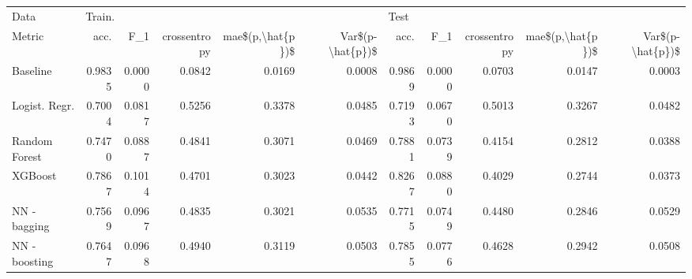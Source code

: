 \begin{tabular}{lrrrrrrrrrr}
\toprule
Data & \multicolumn{5}{l}{Train.} & \multicolumn{5}{l}{Test} \\
Metric &    acc. &     F\_1 & crossentropy & mae\$(p,\textbackslash hat\{p\})\$ & Var\$(p-\textbackslash hat\{p\})\$ &    acc. &     F\_1 & crossentropy & mae\$(p,\textbackslash hat\{p\})\$ & Var\$(p-\textbackslash hat\{p\})\$ \\
\midrule
Baseline      &  0.9835 &  0.0000 &       0.0842 &           0.0169 &           0.0008 &  0.9869 &  0.0000 &       0.0703 &           0.0147 &           0.0003 \\
Logist. Regr. &  0.7004 &  0.0817 &       0.5256 &           0.3378 &           0.0485 &  0.7193 &  0.0670 &       0.5013 &           0.3267 &           0.0482 \\
Random Forest &  0.7470 &  0.0887 &       0.4841 &           0.3071 &           0.0469 &  0.7881 &  0.0739 &       0.4154 &           0.2812 &           0.0388 \\
XGBoost       &  0.7867 &  0.1014 &       0.4701 &           0.3023 &           0.0442 &  0.8267 &  0.0880 &       0.4029 &           0.2744 &           0.0373 \\
NN - bagging  &  0.7569 &  0.0967 &       0.4835 &           0.3021 &           0.0535 &  0.7715 &  0.0749 &       0.4480 &           0.2846 &           0.0529 \\
NN - boosting &  0.7647 &  0.0968 &       0.4940 &           0.3119 &           0.0503 &  0.7855 &  0.0776 &       0.4628 &           0.2942 &           0.0508 \\
\bottomrule
\end{tabular}
